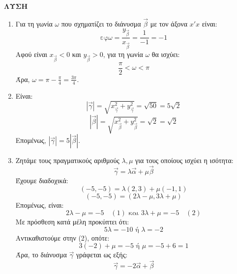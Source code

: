 \textbf{ΛΥΣΗ}

\begin{enumerate}[label=\alph*)]
    \item Για τη γωνία $\omega$ που σχηματίζει το διάνυσμα $\vec{\beta}$ με τον άξονα $x'x$ είναι:
    \[ \text{εφ}\omega = \frac{y_{\vec{\beta}}}{x_{\vec{\beta}}} = \frac{1}{-1} = -1 \]
    Αφού είναι $x_{\vec{\beta}} < 0$ και $y_{\vec{\beta}} > 0$, για τη γωνία $\omega$ θα ισχύει:
    \[ \frac{\pi}{2} < \omega < \pi \]
    Άρα, $\omega = \pi - \frac{\pi}{4} = \frac{3\pi}{4}$.

    \item Είναι:
    \[ |\vec{\gamma}| = \sqrt{x_{\vec{\gamma}}^2 + y_{\vec{\gamma}}^2} = \sqrt{50} = 5\sqrt{2} \]
    \[ |\vec{\beta}| = \sqrt{x_{\vec{\beta}}^2 + y_{\vec{\beta}}^2} = \sqrt{2} = \sqrt{2} \]
    Επομένως, $|\vec{\gamma}| = 5|\vec{\beta}|$.

    \item Ζητάμε τους πραγματικούς αριθμούς $\lambda, \mu$ για τους οποίους ισχύει η ισότητα:
    \[ \vec{\gamma} = \lambda\vec{\alpha} + \mu\vec{\beta} \]
    Έχουμε διαδοχικά:
    \[ (-5,-5) = \lambda(2,3) + \mu(-1,1) \]
    \[ (-5,-5) = (2\lambda-\mu, 3\lambda + \mu) \]
    Επομένως, είναι:
    \[ 2\lambda-\mu = -5 \quad (1) \text{ και } 3\lambda + \mu = -5 \quad (2) \]
    Με πρόσθεση κατά μέλη προκύπτει ότι:
    \[ 5\lambda = -10 \text{ ή } \lambda = -2 \]
    Αντικαθιστούμε στην (2), οπότε:
    \[ 3(-2) + \mu = -5 \text{ ή } \mu = -5 + 6 = 1 \]
    Άρα, το διάνυσμα $\vec{\gamma}$ γράφεται ως εξής:
    \[ \vec{\gamma} = -2\vec{\alpha} + \vec{\beta} \]
\end{enumerate}